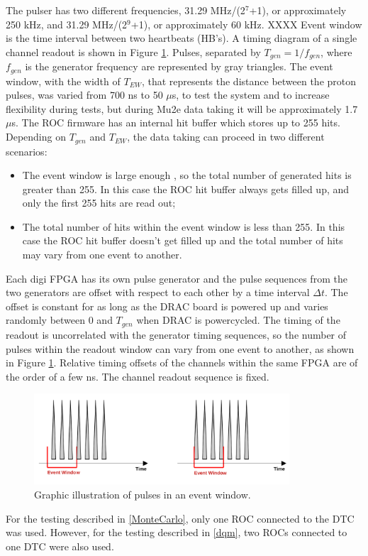     The pulser has two different frequencies,  31.29 MHz/(2$^7$+1), or approximately 250 kHz, 
    and 31.29 MHz/(2$^9$+1), or approximately 60 kHz. XXXX
    Event window is the time interval between two heartbeats (HB's). 
    A timing diagram of a single channel readout is shown in Figure \ref{fig:3}.
    Pulses, separated by $T_{gen}=1/f_{gen}$, where $f_{gen}$ is the generator frequency
    are represented by gray triangles.
    The event window, with the width of $T_{EW}$, that represents the distance between the proton pulses, 
    was varied from 700 ns to 50 $\mu$s, to test the system and to increase flexibility during tests, but during Mu2e data taking it will be approximately 1.7 $\mu$s. 
    The ROC firmware has an internal hit buffer which stores up to 255 hits.
    Depending on $T_{gen}$ and $T_{EW}$, the data taking can proceed in two different
    scenarios:
    \begin{itemize}
    \item
      The event window is large enough , so the total number of generated hits is greater than 255. In this case
      the ROC hit buffer always gets filled up, and only the first 255 hits are read out;
    \item
      The total number of hits within the event window is less than 255.
      In this case the ROC hit buffer doesn't get filled up and the total number of hits may vary from one event to another.
    \end{itemize}
    Each digi FPGA has its own pulse generator and the pulse sequences from the two
    generators are offset with respect to each other by a time interval $\Delta t$. 
    The offset is constant for as long as the DRAC board is powered up and varies randomly between 0 and $T_{gen}$ when DRAC is powercycled. 
    The timing of the readout is uncorrelated with the generator timing sequences, 
    so the number of pulses within the readout window can vary from one event to another, as shown 
    in Figure \ref{fig:3}. Relative timing offsets of the channels within the same FPGA are of the order of a few ns. The channel readout sequence is fixed.
    \begin{figure}[!h]
    \centering
    \includegraphics[width =0.85\textwidth]{figures/png/finalimg.png}
    \caption{Graphic illustration of pulses in an event window.}
    \label{fig:3}
    \end{figure}
    For the testing described in \ref{MonteCarlo}, only one ROC connected to the DTC was used. However, for the testing described in \ref{dqm}, two ROCs connected to one DTC were also used.

